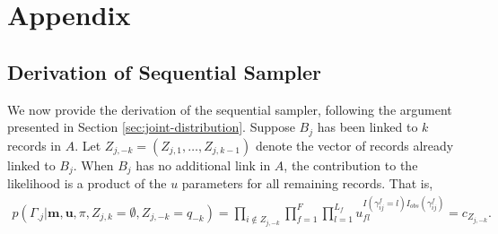 \documentclass[12pt,letterpaper]{article}
\newcommand{\1}[1]{\mathbb{I}\!\left[#1\right]} %
\begin{document}
\section{Appendix}
\label{sec:appendix}

\subsection{Derivation of Sequential Sampler}\label{app:sequential-sampler}
We now provide the derivation of the sequential sampler, following the argument presented in Section \ref{sec:joint-distribution}. Suppose $B_j$ has been linked to $k$ records in $A$. Let $Z_{j, -k} = (Z_{j, 1}, \ldots, Z_{j, k-1})$ denote the vector of records already linked to $B_j$. When $B_j$ has no additional link in $A$, the contribution to the likelihood is a product of the $u$ parameters for all remaining records. That is, 
\begin{align}
	p(\Gamma_{.j}| \bm{m}, \bm{u}, \pi, Z_{j, k} = \emptyset, Z_{j, -k} = q_{-k}) = \prod_{i \notin Z_{j, -k}} \prod_{f=1}^{F}\prod_{l=1}^{L_f} u_{fl}^{I(\gamma_{ij}^f = l)I_{obs}(\gamma_{ij}^f)} = c_{Z_{j, -k}}.
\end{align}
\end{document}
